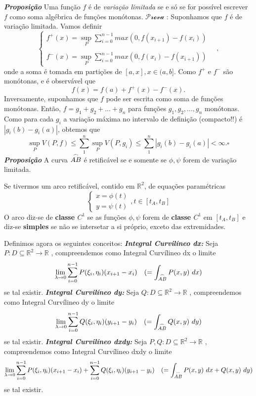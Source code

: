 \documentclass[
]{article}
\begin{document}
\textbf{\emph{Proposição}} Uma função \(f\) é de \emph{variação
limitada} se e só se for possível escrever \(f\) como soma algébrica de
funções monótonas. \(\mathcal{Prova}\) : Suponhamos que \(f\) é de
variação limitada. Vamos definir\[\begin{cases}
    f^+(x)= \sup_P\sum^{n-1}_{i=0}max(0,f(x_{i+1})-f(x_i))\\\\
    f^-(x)= \sup_P\sum^{n-1}_{i=0}max(0,f(x_{i})-f(x_{i+1}))
    \end{cases}\quad,\] onde a soma é tomada em partições de
\([a,x], x\in(a,b]\). Como \(f^+\) e \(f^-\) são monótonas, e é
observável que\[f(x)=f(a)+f^+(x)-f^-(x).\] Inversamente, suponhamos que
\(f\) pode ser escrita como soma de funções monótonas. Então,
\(f=g_1+g_2+...+g_n\) para funções \(g_1,g_2,...,g_n\) monótonas. Como
para cada \(g_i\) a variação máxima no intervalo de definição
(compacto!!) é \(|g_i(b)-g_i(a)|\), obtemos que
\[\sup_P V(P,f)\leq \sum_1^{n}\sup_PV(P,g_i)\leq\sum_1^{n}|g_i(b)-g_i(a)|<\infty.\square\]
\textbf{\emph{Proposição}} A curva
\(\overset{\LARGE \frown}{\small{AB}}\) é retificável se e somente se
\(\phi, \psi\) forem de variação limitada.

Se tivermos um arco retificável, contido em \(\mathbb{R}^2\), de
equações paramétricas \[
\begin{cases}x=\phi(t)\\y=\psi(t)\end{cases},t\in[t_A,t_B]
\] O arco diz-se de \textbf{classe \(C^1\)} se as funções \(\phi, \psi\)
forem de \textbf{classe \(C^1\)} em \([t_A,t_B]\) e diz-se
\textbf{simples} se não se intersetar a si próprio, exceto das
extremidades.

Definimos agora os seguintes conceitos: \textbf{\emph{Integral
Curvilíneo dx:}} Seja
\(P:D\subseteq \mathbb{R}^2\longrightarrow \mathbb{R}\) , compreendemos
como Integral Curvílineo dx o limite
\[\lim_{\lambda\rightarrow 0}\sum^{n-1}_{i=0}P(\xi_i,\eta_i)(x_{i+1}-x_{i})\quad(=\int_{\overset{\LARGE \frown}{\small{AB}}}P(x,y)\ dx)\]
se tal existir. \textbf{\emph{Integral Curvilíneo dy:}} Seja
\(Q:D\subseteq \mathbb{R}^2\longrightarrow \mathbb{R}\) , compreendemos
como Integral Curvílineo dy o limite
\[\lim_{\lambda\rightarrow 0}\sum^{n-1}_{i=0}Q(\xi_i,\eta_i)(y_{i+1}-y_{i})\quad(=\int_{\overset{\LARGE \frown}{\small{AB}}}Q(x,y)\ dy)\]
se tal existir. \textbf{\emph{Integral Curvilíneo dxdy:}} Seja
\(P,Q:D\subseteq \mathbb{R}^2\longrightarrow \mathbb{R}\) ,
compreendemos como Integral Curvílineo dxdy o limite
\[\lim_{\lambda\rightarrow 0}\sum^{n-1}_{i=0}P(\xi_i,\eta_i)(x_{i+1}-x_{i})+\sum^{n-1}_{i=0}Q(\xi_i,\eta_i)(y_{i+1}-y_{i})\quad(=\int_{\overset{\LARGE \frown}{\small{AB}}}P(x,y)\ dx+Q(x,y)\ dy)\]
se tal existir.
\end{document}
